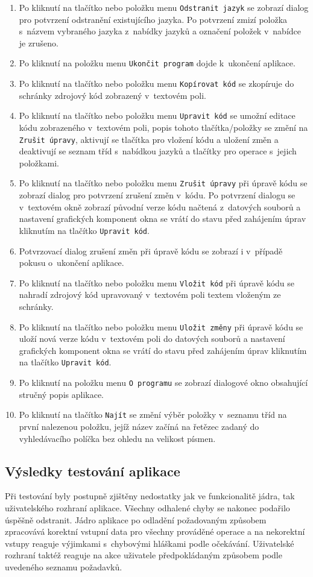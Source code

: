 \documentclass[czech,BP]{thesiskiv}
\begin{document}
\begin{enumerate}
\item{Po kliknutí na tlačítko nebo položku menu \texttt{Odstranit jazyk} se zobrazí dialog pro potvrzení odstranění existujícího jazyka. Po potvrzení zmizí položka s~názvem vybraného jazyka z~nabídky jazyků a označení položek v~nabídce je zrušeno.}
\item{Po kliknutí na položku menu \texttt{Ukončit program} dojde k~ukončení aplikace.}
\item{Po kliknutí na tlačítko nebo položku menu \texttt{Kopírovat kód} se zkopíruje do schránky zdrojový kód zobrazený v~textovém poli.}
\item{Po kliknutí na tlačítko nebo položku menu \texttt{Upravit kód} se umožní editace kódu zobrazeného v~textovém poli, popis tohoto tlačítka/položky se změní na \texttt{Zrušit úpravy}, aktivují se tlačítka pro vložení kódu a uložení změn a deaktivují se seznam tříd s~nabídkou jazyků a tlačítky pro operace s~jejich položkami.}
\item{Po kliknutí na tlačítko nebo položku menu \texttt{Zrušit úpravy} při úpravě kódu se zobrazí dialog pro potvrzení zrušení změn v~kódu. Po potvrzení dialogu se v~textovém okně zobrazí původní verze kódu načtená z~datových souborů a nastavení grafických komponent okna se vrátí do stavu před zahájením úprav kliknutím na tlačítko \texttt{Upravit kód}.} \item{Potvrzovací dialog zrušení změn při úpravě kódu se zobrazí i v~případě pokusu o~ukončení aplikace.}
\item{Po kliknutí na tlačítko nebo položku menu \texttt{Vložit kód} při úpravě kódu se nahradí zdrojový kód upravovaný v~textovém poli textem vloženým ze schránky.}
\item{Po kliknutí na tlačítko nebo položku menu \texttt{Uložit změny} při úpravě kódu se uloží nová verze kódu v~textovém poli do datových souborů a nastavení grafických komponent okna se vrátí do stavu před zahájením úprav kliknutím na tlačítko \texttt{Upravit kód}.}
\item{Po kliknutí na položku menu \texttt{O~programu} se zobrazí dialogové okno obsahující stručný popis aplikace.}
\item{Po kliknutí na tlačítko \texttt{Najít} se změní výběr položky v~seznamu tříd na první nalezenou položku, jejíž název začíná na řetězec zadaný do vyhledávacího políčka bez ohledu na velikost písmen.}
\end{enumerate}

\subsection{Výsledky testování aplikace}
Při testování byly postupně zjištěny nedostatky jak ve funkcionalitě jádra, tak uživatelského rozhraní aplikace. Všechny odhalené chyby se nakonec podařilo úspěšně odstranit. Jádro aplikace po odladění požadovaným způsobem zpracovává korektní vstupní data pro všechny prováděné operace a na nekorektní vstupy reaguje výjimkami s~chybovými hláškami podle očekávání. Uživatelské rozhraní taktéž reaguje na akce uživatele předpokládaným způsobem podle uvedeného seznamu požadavků.
\end{document}
